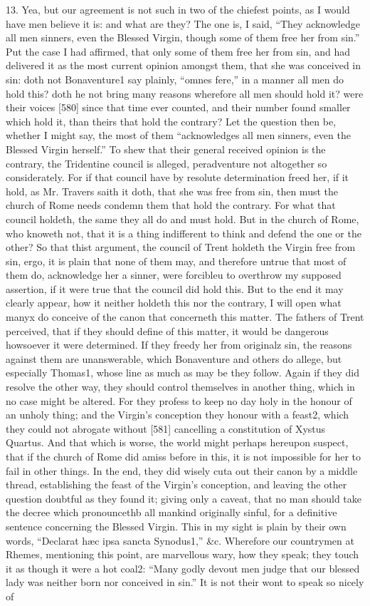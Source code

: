13. Yea, but our agreement is not such in two of the chiefest points, as I would have men believe it is: and what are they? The one is, I said, “They acknowledge all men sinners, even the Blessed Virgin, though some of them free her from sin.” Put the case I had affirmed, that only some of them free her from sin, and had delivered it as the most current opinion amongst them, that she was conceived in sin: doth not Bonaventure1 say plainly, “omnes fere,” in a manner all men do hold this? doth he not bring many reasons wherefore all men should hold it? were their voices [580] since that time ever counted, and their number found smaller which hold it, than theirs that hold the contrary? Let the question then be, whether I might say, the most of them “acknowledges all men sinners, even the Blessed Virgin herself.” To shew that their general received opinion is the contrary, the Tridentine council is alleged, peradventure not altogether so considerately. For if that council have by resolute determination freed her, if it hold, as Mr. Travers saith it doth, that she was free from sin, then must the church of Rome needs condemn them that hold the contrary. For what that council holdeth, the same they all do and must hold. But in the church of Rome, who knoweth not, that it is a thing indifferent to think and defend the one or the other? So that thist argument, the council of Trent holdeth the Virgin free from sin, ergo, it is plain that none of them may, and therefore untrue that most of them do, acknowledge her a sinner, were forcibleu to overthrow my supposed assertion, if it were true that the council did hold this. But to the end it may clearly appear, how it neither holdeth this nor the contrary, I will open what manyx do conceive of the canon that concerneth this matter. The fathers of Trent perceived, that if they should define of this matter, it would be dangerous howsoever it were determined. If they freedy her from originalz sin, the reasons against them are unanswerable, which Bonaventure and others do allege, but especially Thomas1, whose line as much as may be they follow. Again if they did resolve the other way, they should control themselves in another thing, which in no case might be altered. For they profess to keep no day holy in the honour of an unholy thing; and the Virgin’s conception they honour with a feast2, which they could not abrogate without [581] cancelling a constitution of Xystus Quartus. And that which is worse, the world might perhaps hereupon suspect, that if the church of Rome did amiss before in this, it is not impossible for her to fail in other things. In the end, they did wisely cuta out their canon by a middle thread, establishing the feast of the Virgin’s conception, and leaving the other question doubtful as they found it; giving only a caveat, that no man should take the decree which pronouncethb all mankind originally sinful, for a definitive sentence concerning the Blessed Virgin. This in my sight is plain by their own words, “Declarat hæc ipsa sancta Synodus1,” &c. Wherefore our countrymen at Rhemes, mentioning this point, are marvellous wary, how they speak; they touch it as though it were a hot coal2: “Many godly devout men judge that our blessed lady was neither born nor conceived in sin.” It is not their wont to speak so nicely of 